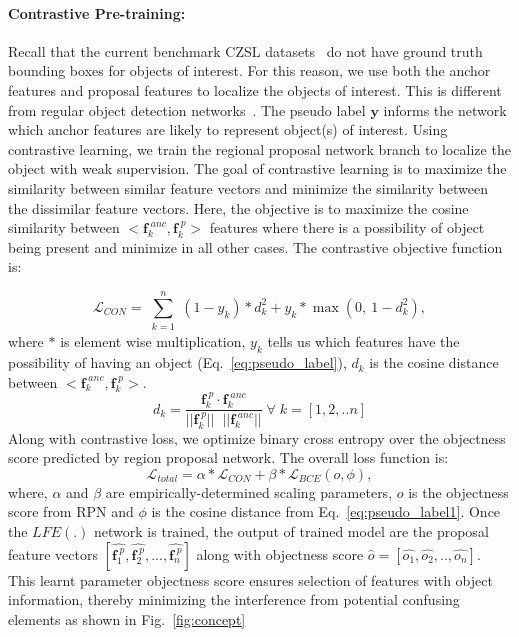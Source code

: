 \documentclass{bmvc2k}
\begin{document}
\vspace{-0.2cm}
\paragraph{Contrastive Pre-training:}\label{section:contrastive pre-train}Recall that the current benchmark CZSL datasets~\cite{isola2015discovering,mancini2021learning,yu2017semantic} do not have ground truth bounding boxes for objects of interest. For this reason, we use both the anchor features and proposal features to localize the objects of interest. This is different from regular object detection networks~\cite{ren2015faster}. 
The pseudo label $\mathbf{y}$ informs the network which anchor features are likely to represent object(s) of interest. Using contrastive learning, we train the regional proposal network branch to localize the object with weak supervision.
The goal of contrastive learning is to maximize the similarity between similar feature vectors and minimize the similarity between the dissimilar feature vectors. 
Here, the objective is to maximize the cosine similarity between $< \textbf{f}^{\;anc}_k, \textbf{f}^{\;p}_k>$ features where there is a possibility of object being present and minimize in all other cases. The contrastive objective function is:

\begin{equation}
    \mathcal{L}_{CON}= \sum_{\substack{k=1}}^{n}(1-y_{k})*d_{k}^2
    + y_{k}*{\max (0,\: 1 - d_{k}^2)},
    \label{eq:CL}
\end{equation}
where $*$ is element wise multiplication, $y_{k}$ tells us which features have the possibility of having an object (Eq.~\ref{eq:pseudo_label}), $d_{k}$ is the cosine distance between $< \textbf{f}^{\;anc}_k, \textbf{f}^{\;p}_k>$.
\begin{equation}
    d_{k} = \frac{\textbf{f}^{\;p}_k \cdot \textbf{f}^{\;anc}_k}{||\textbf{f}^{\;p}_k||\;\; ||\textbf{f}^{\;anc}_k||} \; \forall\; k=[1, 2, .. n]     
\end{equation}
Along with contrastive loss, we optimize binary cross entropy over the objectness score predicted by region proposal network. The overall loss function is:
\begin{equation}
    \mathcal{L}_{total} = \alpha * \mathcal{L}_{CON} + \beta * \mathcal{L}_{BCE}(o, \phi),
    \label{eq:loss_cl}
\end{equation}
where, $\alpha$ and $\beta$ are empirically-determined scaling parameters, $o$ is the objectness score from RPN and $\phi$ is the cosine distance from Eq.~\ref{eq:pseudo_label1}. Once the $LFE(.)$ network is trained, the output of trained model are the proposal feature vectors $[\hat{\textbf{f}^{\;p}_1}, \hat{\textbf{f}^{\;p}_2}, ..., \hat{\textbf{f}^{\;p}_n}]$ along with objectness score $\hat{o} = [\hat{o_1}, \hat{o_2}, .., \hat{o_n}]$. This learnt parameter objectness score ensures selection of features with object information, thereby minimizing the interference from potential confusing elements as shown in Fig.~\ref{fig:concept}
\end{document}

